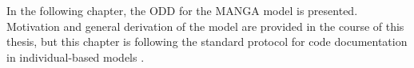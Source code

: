 %
%
%
%
%
%
In the following chapter, the ODD for the MANGA model is presented.
Motivation and general derivation of the model are provided in the course of this thesis, but this chapter is following the standard protocol for code documentation in individual-based models \citep{Grimm2020}.


